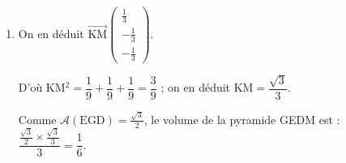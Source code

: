\documentclass[10pt]{article}
\providecommand{\vect}[1]{\overrightarrow{#1}}
\begin{document}
\begin{enumerate}
\begin{enumerate}
Conclusion : K a pour coordonnées $\left(\dfrac{1}{3}~;~\dfrac{2}{3}~;~\dfrac{2}{3} \right)$.
		\item 
On en déduit $\vect{\text{KM}}\begin{pmatrix}\frac{1}{3}\\[3pt]- \frac{1}{3}\\[3pt]- \frac{1}{3}\end{pmatrix}$.

D'où KM$^2 = \dfrac{1}{9} + \dfrac{1}{9} + \dfrac{1}{9} = \dfrac{3}{9}$ ; on en déduit KM$ = \dfrac{\sqrt{3}}{3}$.
		




Comme $\mathcal{A}(\text{EGD}) = \frac{\sqrt{3}}{2}$, le volume de la pyramide GEDM est  : $\dfrac{\frac{\sqrt{3}}{2}\times \frac{\sqrt{3}}{3}}{3} = \dfrac{1}{6}$.
	\end{enumerate}
\end{enumerate}

\bigskip
\end{document}
